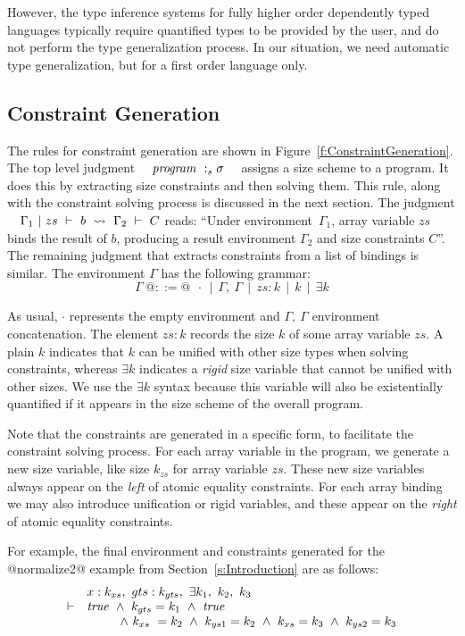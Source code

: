 However, the type inference systems for fully higher order dependently typed languages typically require quantified types to be provided by the user, and do not perform the type generalization process. In our situation, we need automatic type generalization, but for a first order language only.


\subsection{Constraint Generation}
The rules for constraint generation are shown in Figure~\ref{f:ConstraintGeneration}. The top level judgment ~~$\mathit{program} ~:_{s} \sigma$~~ assigns a size scheme to a program. It does this by extracting size constraints and then solving them. This rule, along with the constraint solving process is discussed in the next section. The judgment ~~$\Gamma_1 ~|~ zs ~\vdash~ b ~\leadsto~ \Gamma_2 ~\vdash~ C$ reads: ``Under environment~$\Gamma_1$, array variable $zs$ binds the result of $b$, producing a result environment $\Gamma_2$ and size constraints $C$''. The remaining judgment that extracts constraints from a list of bindings is similar. The environment $\Gamma$ has the following grammar:
$$
\Gamma~ @::=@ ~~\cdot ~~|~~ \Gamma,~ \Gamma ~~|~~ zs : k ~~|~~ k ~~|~~ \exists k
$$

As usual, $\cdot$ represents the empty environment and  $\Gamma,~ \Gamma$
environment concatenation. The element $zs : k$ records the size $k$ of some
array variable $zs$. A plain $k$ indicates that $k$ can be unified with other
size types when solving constraints, whereas $\exists k$ indicates a  \emph{rigid} size variable that cannot be unified with other sizes. We use the $\exists k$ syntax because this variable will also be existentially quantified if it appears in the size scheme of the overall program.

Note that the constraints are generated in a specific form, to facilitate the constraint solving process. For each array variable in the program, we generate a new size variable, like size $k_{zs}$ for array variable $zs$. These new size variables always appear on the \emph{left} of atomic equality constraints. For each array binding we may also introduce unification or rigid variables, and these appear on the \emph{right} of atomic equality constraints.

For example, the final environment and constraints generated for the @normalize2@ example from Section~\ref{s:Introduction} are as follows:
$$
\begin{array}{ll}
       & x : k_{xs},~ gts : k_{gts},~ \exists k_1,~ k_2,~ k_3 
\\
\vdash & \mathit{true} 
        ~\wedge~  k_{gts} = k_1
        ~\wedge~  \mathit{true}
\\     &~~~~~~~~ 
          \wedge~  k_{xs}  ~= k_2
        ~ \wedge~  k_{ys1}  = k_2 
        ~ \wedge~  k_{xs}   = k_3
        ~ \wedge~  k_{ys2}  = k_3
\end{array}
$$

